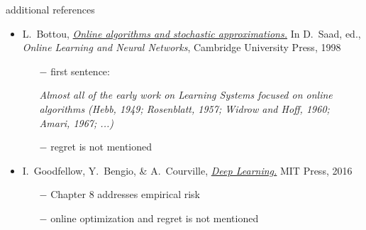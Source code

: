 \documentclass[xcolor={svgnames},
               hyperref={colorlinks,citecolor=DeepPink4,linkcolor=FireBrick,urlcolor=Maroon}]
               {beamer}
\begin{document}
\begin{frame}{additional references}

\begin{itemize}
\footnotesize
\item L.~Bottou, \href{http://leon.bottou.org/papers/bottou-98x}{\emph{Online algorithms and stochastic approximations.}}  In D.~Saad, ed., \emph{Online Learning and Neural Networks}, Cambridge University Press, 1998
    \begin{itemize}
    \scriptsize
    \item[$-$] first sentence:

\emph{Almost all of the early work on Learning Systems focused on online algorithms (Hebb, 1949; Rosenblatt, 1957; Widrow and Hoff, 1960; Amari, 1967; ...)}

    \item[$-$] regret is not mentioned
    \end{itemize}
\item I.~Goodfellow, Y.~Bengio, \& A.~Courville, \href{https://www.deeplearningbook.org/}{\emph{Deep Learning.}} MIT Press, 2016
    \begin{itemize}
    \scriptsize
    \item[$-$] Chapter 8 addresses empirical risk
    \item[$-$] online optimization and regret is not mentioned
    \end{itemize}
\end{itemize}
\end{frame}
\end{document}
